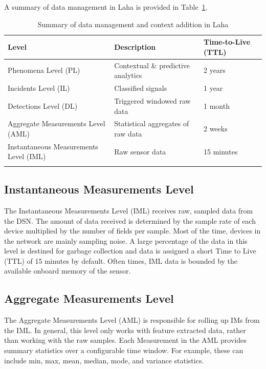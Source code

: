 A summary of data management in Laha is provided in Table~\ref{data-managament-table}.

\begin{table}[h]
	\centering
	\begin{tabularx}{\textwidth}{lXl}
		\toprule
		\textbf{Level} & \textbf{Description} & \textbf{Time-to-Live (TTL)} \\
		\midrule
		Phenomena Level (PL) & Contextual \& predictive analytics & 2 years \\
		Incidents Level (IL) & Classified signals & 1 year \\
		Detections Level (DL) & Triggered windowed raw data & 1 month  \\
		Aggregate Measurements Level (AML) & Statistical aggregates of raw data  & 2 weeks  \\
		Instantaneous Measurements Level (IML) & Raw sensor data  & 15 minutes \\
		\bottomrule
		\label{data-managament-table}
	\end{tabularx}
	\caption{Summary of data management and context addition in Laha}
\end{table}

\subsection{Instantaneous Measurements Level}\label{subsec:instantaneous-measurements-level}
The Instantaneous Measurements Level (IML) receives raw, sampled data from the DSN. The amount of data received is determined by the sample rate of each device multiplied by the number of fields per sample. Most of the time, devices in the network are mainly sampling noise. A large percentage of the data in this level is destined for garbage collection and data is assigned a short Time to Live (TTL) of 15 minutes by default. Often times, IML data is bounded by the available onboard memory of the sensor.

\subsection{Aggregate Measurements Level}\label{subsec:aggregate-measurements-level}
The Aggregate Measurements Level (AML) is responsible for rolling up IMs from the IML. In general, this level only works with feature extracted data, rather than working with the raw samples. Each Measurement in the AML provides summary statistics over a configurable time window. For example, these can include min, max, mean, median, mode, and variance statistics.

